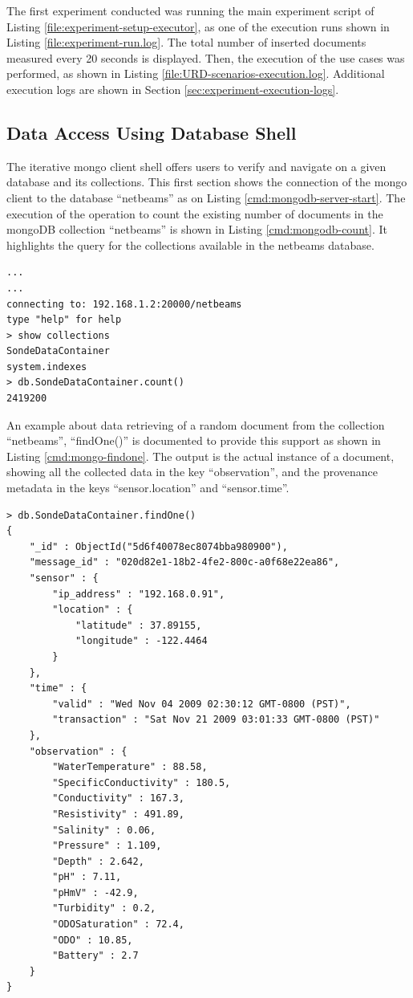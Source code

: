 The first experiment conducted was running the main experiment script of Listing
\ref{file:experiment-setup-executor}, as one of the execution runs shown in
Listing \ref{file:experiment-run.log}. The total number of inserted documents
measured every 20 seconds is displayed. Then, the execution of the use cases
was performed, as shown in Listing \ref{file:URD-scenarios-execution.log}.
Additional execution logs are shown in Section
\ref{sec:experiment-execution-logs}.

\subsection{Data Access Using Database Shell}
\label{sec:mongodb-user-experience}

The iterative mongo client shell offers users to verify and navigate on a
given database and its collections. This first section shows the connection of
the mongo client to the database ``netbeams'' as on Listing
\ref{cmd:mongodb-server-start}. The execution of the operation to count the
existing number of documents in the mongoDB collection ``netbeams'' is shown in
Listing \ref{cmd:mongodb-count}. It highlights the query for the collections
available \cite{mongodb} in the netbeams database.

\lstset{label=cmd:mongodb-count,caption=Starting the Server}
\begin{lstlisting}
...
...
connecting to: 192.168.1.2:20000/netbeams
type "help" for help
> show collections
SondeDataContainer
system.indexes
> db.SondeDataContainer.count()
2419200
\end{lstlisting}

An example about data retrieving of a random document from the collection
``netbeams'', ``findOne()'' is documented to provide this support as shown in
Listing \ref{cmd:mongo-findone}. The output is the actual instance of a
document, showing all the collected data in the key ``observation'', and the
provenance metadata in the keys ``sensor.location'' and ``sensor.time''.

\lstset{label=cmd:mongo-findone,caption=Querying the database: one item}
\begin{lstlisting}
> db.SondeDataContainer.findOne()
{
    "_id" : ObjectId("5d6f40078ec8074bba980900"),
    "message_id" : "020d82e1-18b2-4fe2-800c-a0f68e22ea86",
    "sensor" : {
        "ip_address" : "192.168.0.91",
        "location" : {
            "latitude" : 37.89155,
            "longitude" : -122.4464
        }
    },
    "time" : {
        "valid" : "Wed Nov 04 2009 02:30:12 GMT-0800 (PST)",
        "transaction" : "Sat Nov 21 2009 03:01:33 GMT-0800 (PST)"
    },
    "observation" : {
        "WaterTemperature" : 88.58,
        "SpecificConductivity" : 180.5,
        "Conductivity" : 167.3,
        "Resistivity" : 491.89,
        "Salinity" : 0.06,
        "Pressure" : 1.109,
        "Depth" : 2.642,
        "pH" : 7.11,
        "pHmV" : -42.9,
        "Turbidity" : 0.2,
        "ODOSaturation" : 72.4,
        "ODO" : 10.85,
        "Battery" : 2.7
    }
}
\end{lstlisting}

